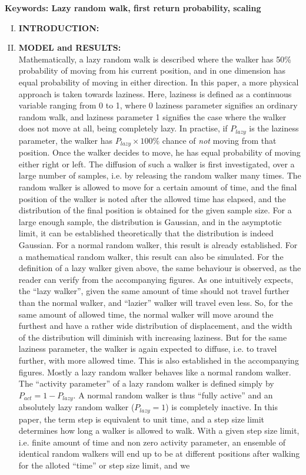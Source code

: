 \documentclass[12pt]{article}
\begin{document}
\vspace{1.2 cm}
\textbf{Keywords: Lazy random walk, first return probability, scaling}
\newpage
\begin{enumerate}[I.]
  \item \textbf{INTRODUCTION: } \\

    \blindtext[2]
    \item \textbf{MODEL and RESULTS: } \\

Mathematically, a lazy random walk is described where the walker has 50\% probability of moving from his current position, and in one dimension has equal probability of moving in either direction. In this paper, a more physical approach is taken towards laziness. Here, laziness is defined as a continuous variable ranging from 0 to 1, where 0 laziness parameter signifies an ordinary random walk, and laziness parameter 1 signifies the case where the walker does not move at all, being completely lazy. In practise, if $P_{lazy}$ is the laziness parameter, the walker has $P_{lazy}\times 100 \%$ chance of \emph{not} moving from that position. Once the walker decides to move, he has equal probability of moving either right or left. The diffusion of such a walker is first investigated, over a large number of samples, i.e. by releasing the random walker many times. The random walker is allowed to move for a certain amount of time, and the final position of the walker is noted after the allowed time has elapsed, and the distribution of the final position is obtained for the given sample size. For a large enough sample, the distribution is Gaussian, and in the asymptotic limit, it can be established theoretically that the distribution is indeed Gaussian. For a normal random walker, this result is already established. For a mathematical random walker, this result can also be simulated. For the definition of a lazy walker given above, the same behaviour is observed, as the reader can verify from the accompanying figures. As one intuitively expects, the ``lazy walker'', given the same amount of time should not travel further than the normal walker, and ``lazier'' walker will travel even less. So, for the same amount of allowed time, the normal walker will move around the furthest and have a rather wide distribution of displacement, and the width of the distribution will diminish with increasing laziness. But for the same laziness parameter, the walker is again expected to diffuse, i.e. to travel further, with more allowed time. This is also established in the accompanying figures. Mostly a lazy random walker behaves like a normal random walker. The ``activity parameter'' of a lazy random walker is defined simply by $P_{act}=1-P_{lazy}$. A normal random walker is thus ``fully active'' and an absolutely lazy random walker ($P_{lazy}=1$) is completely inactive. In this paper, the term step is equivalent to unit time, and a step size limit determines how long a walker is allowed to walk. With a given step size limit, i.e. finite amount of time and non zero activity parameter, an ensemble of identical random walkers will end up to be at different positions after walking for the alloted ``time'' or step size limit, and we 
\end{enumerate}
\end{document}
